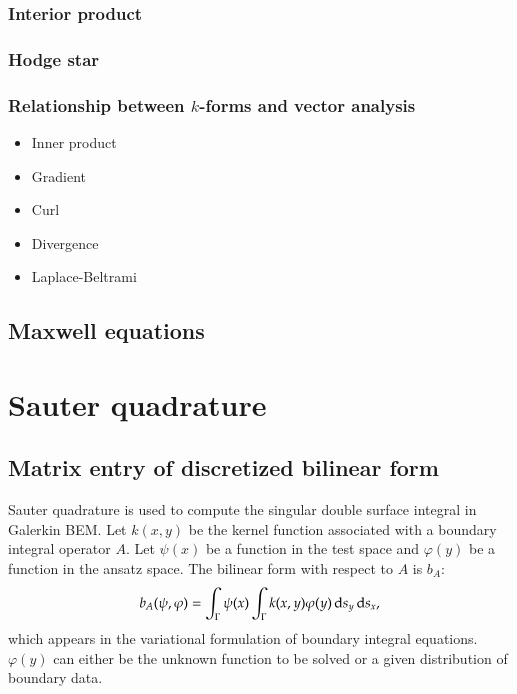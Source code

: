 \documentclass[11pt, a4paper]{book}
\begin{document}
\subsection{Interior product}

\subsection{Hodge star}

\subsection{Relationship between $k$-forms and vector analysis}

\begin{itemize}
\item Inner product
\item Gradient
\item Curl
\item Divergence
\item Laplace-Beltrami
\end{itemize}

\section{Maxwell equations}

\chapter{Sauter quadrature}
\label{sec:sauter-quad}

\section{Matrix entry of discretized bilinear form}

Sauter quadrature is used to compute the singular double surface integral in Galerkin BEM.
Let $k(x,y)$ be the kernel function associated with a boundary integral operator $A$. Let
$\psi(x)$ be a function in the test space and $\varphi(y)$ be a function in the ansatz
space. The bilinear form with respect to $A$ is $b_A$:
\begin{equation}
  \label{eq:bem-bilinear-form-general}
  b_A(\psi, \varphi) = \int_{\Gamma}\psi(x)\int_{\Gamma}k(x,y)\varphi(y) \,\mathrm{d} s_y \,\mathrm{d} s_x,
\end{equation}
which appears in the variational formulation of boundary integral equations. $\varphi(y)$
can either be the unknown function to be solved or a given distribution of boundary data.
\end{document}
